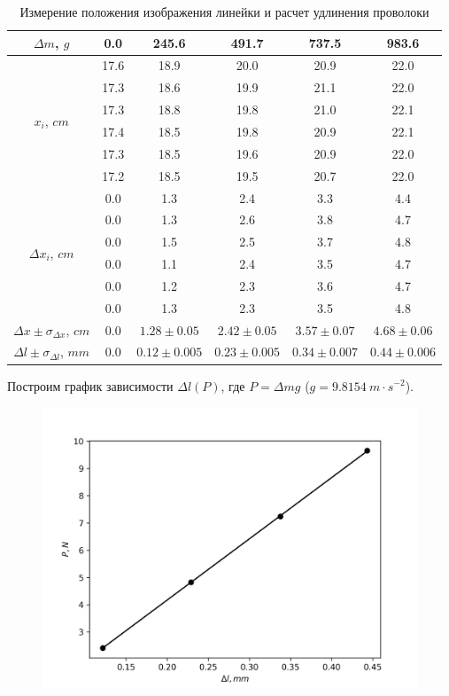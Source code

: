 \documentclass[14pt, a4paper]{article}
\begin{document}
\begin{table}[!h]
\centering
\begin{tabular}{| c | c | c | c | c | c |}

\hline
$\Delta m$, $g$ & 0.0 & 245.6 & 491.7 & 737.5 & 983.6 \\
\hline
\hline
\multirow{6}{*}{$x_i$, $cm$} 
& 17.6 & 18.9 & 20.0 & 20.9 & 22.0 \\
\cline{2-6}
& 17.3 & 18.6 & 19.9 & 21.1 & 22.0 \\
\cline{2-6}
& 17.3 & 18.8 & 19.8 & 21.0 & 22.1 \\
\cline{2-6}
& 17.4 & 18.5 & 19.8 & 20.9 & 22.1 \\
\cline{2-6}
& 17.3 & 18.5 & 19.6 & 20.9 & 22.0 \\
\cline{2-6}
& 17.2 & 18.5 & 19.5 & 20.7 & 22.0 \\
\hline
\hline
\multirow{6}{*}{$\Delta x_i$, $cm$}
& 0.0 & 1.3 & 2.4 & 3.3 & 4.4 \\
\cline{2-6}
& 0.0 & 1.3 & 2.6 & 3.8 & 4.7 \\
\cline{2-6}
& 0.0 & 1.5 & 2.5 & 3.7 & 4.8 \\
\cline{2-6}
& 0.0 & 1.1 & 2.4 & 3.5 & 4.7 \\
\cline{2-6}
& 0.0 & 1.2 & 2.3 & 3.6 & 4.7 \\
\cline{2-6}
& 0.0 & 1.3 & 2.3 & 3.5 & 4.8 \\
\hline
\hline
$\Delta x\pm\sigma_{\Delta x}$, $cm$ 
& 0.0 & $1.28\pm0.05$ & $2.42\pm0.05$ & $3.57\pm0.07$ & $4.68\pm0.06$ \\
\hline
$\Delta l\pm\sigma_{\Delta l}$, $mm$ 
& 0.0 & $0.12\pm0.005$ & $0.23\pm0.005$ & $0.34\pm0.007$ & $0.44\pm0.006$ \\
\hline

\end{tabular}
\label{table2}
\caption{Измерение положения изображения линейки и расчет удлинения проволоки}
\end{table}

Построим график зависимости $\Delta l(P)$, где $P=\Delta mg$ ($g=9.8154\ m\cdot s^{-2}$).

\begin{figure}[!h]
\centering
\includegraphics[scale=0.7]{laba6_1.png}
\label{image1}
\end{figure}
\end{document}
